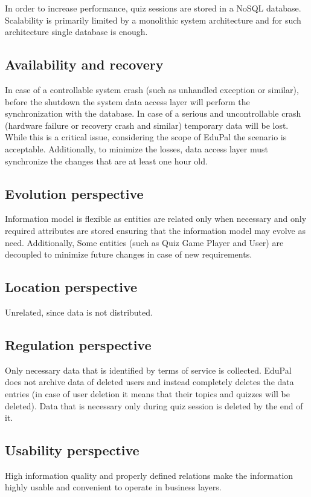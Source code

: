 In order to increase performance, quiz sessions are stored in a NoSQL database. Scalability is primarily limited by a monolithic system architecture and for such architecture single database is enough.

\subsection{Availability and recovery}

In case of a controllable system crash (such as unhandled exception or similar), before the shutdown the system data access layer will perform the synchronization with the database. In case of a serious and uncontrollable crash (hardware failure or recovery crash and similar) temporary data will be lost. While this is a critical issue, considering the scope of EduPal the scenario is acceptable. Additionally, to minimize the losses, data access layer must synchronize the changes that are at least one hour old.

\subsection{Evolution perspective}

Information model is flexible as entities are related only when necessary and only required attributes are stored ensuring that the information model may evolve as need. Additionally, Some entities (such as Quiz Game Player and User) are decoupled to minimize future changes in case of new requirements.

\subsection{Location perspective}

Unrelated, since data is not distributed.

\subsection{Regulation perspective}

Only necessary data that is identified by terms of service is collected. EduPal does not archive data of deleted users and instead completely deletes the data entries (in case of user deletion it means that their topics and quizzes will be deleted). Data that is necessary only during quiz session is deleted by the end of it.

\subsection{Usability perspective}

High information quality and properly defined relations make the information highly usable and convenient to operate in business layers.
